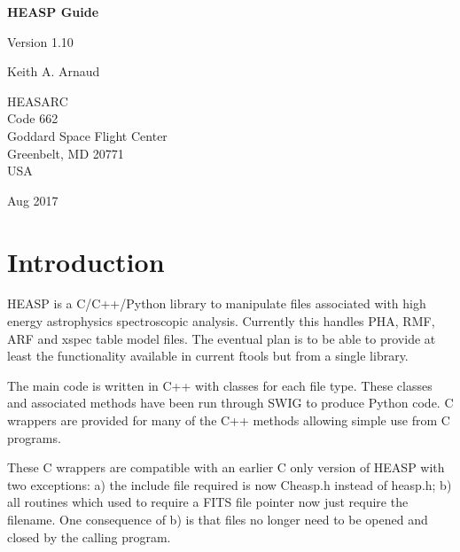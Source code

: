 \documentclass[11pt]{book}
\begin{document}
\begin{titlepage}
\normalsize
\vspace*{4.0cm}
\begin{center}
{\Huge \bf HEASP Guide}\\
\end{center}
\medskip
\medskip
\begin{center}
{\Large Version 1.10 \\}
\end{center}
\bigskip
\begin{center}
{\Large Keith A. Arnaud \\}
\end{center}
\medskip
\medskip
\begin{center}
{HEASARC\\
Code 662\\
Goddard Space Flight Center\\
Greenbelt, MD 20771\\
USA}
\end{center}

\vfill
\bigskip
\begin{center}
{\Large Aug 2017\\}
\end{center}
\vfill
\end{titlepage}


\tableofcontents
{}
\chapter{Introduction}

HEASP is a C/C++/Python library to manipulate files associated with
high energy astrophysics spectroscopic analysis. Currently this
handles PHA, RMF, ARF and xspec table model files. The eventual plan 
is to be able to provide at least the functionality available in 
current ftools but from a single library.

The main code is written in C++ with classes for each file type. These
classes and associated methods have been run through SWIG to produce
Python code. C wrappers are provided for many of the C++ methods
allowing simple use from C programs.

These C wrappers are compatible
with an earlier C only version of HEASP with two exceptions: a) the
include file required is now Cheasp.h instead of heasp.h; b) all
routines which used to require a FITS file pointer now just require
the filename. One consequence of b) is that files no longer need to be
opened and closed by the calling program.
\end{document}
